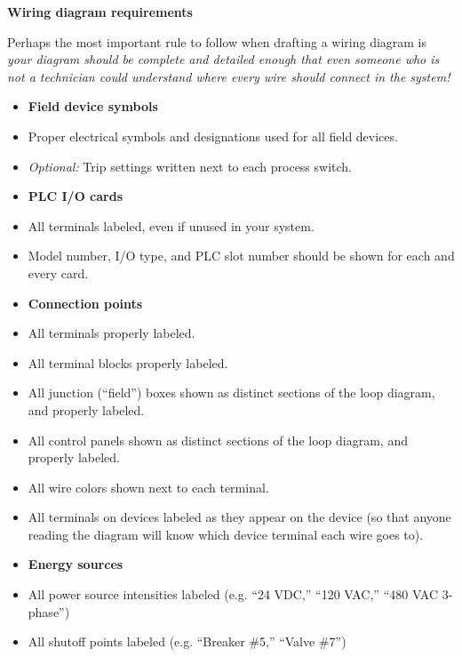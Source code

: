 


\noindent
{\bf Wiring diagram requirements}

Perhaps the most important rule to follow when drafting a wiring diagram is {\it your diagram should be complete and detailed enough that even someone who is not a technician could understand where every wire should connect in the system!}

\begin{itemize}
\item{} {\bf Field device symbols}
\item{} Proper electrical symbols and designations used for all field devices.
\item{} {\it Optional:} Trip settings written next to each process switch.
\end{itemize}

\begin{itemize}
\item{} {\bf PLC I/O cards}
\item{} All terminals labeled, even if unused in your system.
\item{} Model number, I/O type, and PLC slot number should be shown for each and every card.
\end{itemize}

\begin{itemize}
\item{} {\bf Connection points}
\item{} All terminals properly labeled.
\item{} All terminal blocks properly labeled.
\item{} All junction (``field'') boxes shown as distinct sections of the loop diagram, and properly labeled.
\item{} All control panels shown as distinct sections of the loop diagram, and properly labeled.
\item{} All wire colors shown next to each terminal.
\item{} All terminals on devices labeled as they appear on the device (so that anyone reading the diagram will know which device terminal each wire goes to).
\end{itemize}

\begin{itemize}
\item{} {\bf Energy sources}
\item{} All power source intensities labeled (e.g. ``24 VDC,'' ``120 VAC,'' ``480 VAC 3-phase'')
\item{} All shutoff points labeled (e.g. ``Breaker \#5,'' ``Valve \#7'')
\end{itemize}

